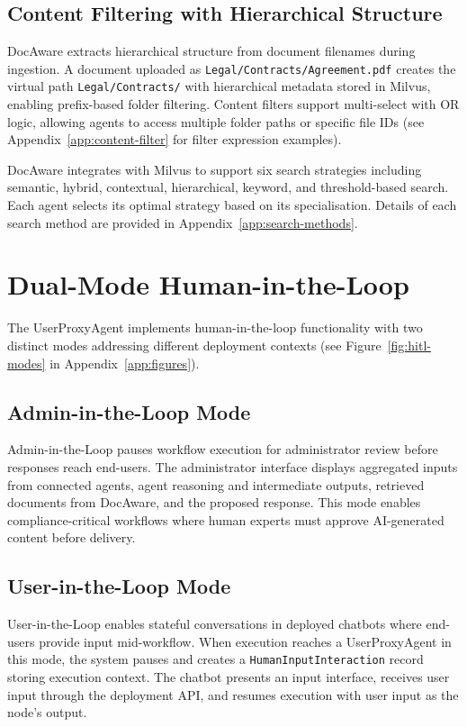 \documentclass[11pt]{article}
\begin{document}
\subsection{Content Filtering with Hierarchical Structure}

DocAware extracts hierarchical structure from document filenames during ingestion. A document uploaded as \texttt{Legal/Contracts/Agreement.pdf} creates the virtual path \texttt{Legal/Contracts/} with hierarchical metadata stored in Milvus, enabling prefix-based folder filtering. Content filters support multi-select with OR logic, allowing agents to access multiple folder paths or specific file IDs (see Appendix~\ref{app:content-filter} for filter expression examples).

DocAware integrates with Milvus to support six search strategies including semantic, hybrid, contextual, hierarchical, keyword, and threshold-based search. Each agent selects its optimal strategy based on its specialisation. Details of each search method are provided in Appendix~\ref{app:search-methods}.


\section{Dual-Mode Human-in-the-Loop}
\label{sec:hitl}

The UserProxyAgent implements human-in-the-loop functionality with two distinct modes addressing different deployment contexts (see Figure~\ref{fig:hitl-modes} in Appendix~\ref{app:figures}).

\subsection{Admin-in-the-Loop Mode}

Admin-in-the-Loop pauses workflow execution for administrator review before responses reach end-users. The administrator interface displays aggregated inputs from connected agents, agent reasoning and intermediate outputs, retrieved documents from DocAware, and the proposed response. This mode enables compliance-critical workflows where human experts must approve AI-generated content before delivery.

\subsection{User-in-the-Loop Mode}

User-in-the-Loop enables stateful conversations in deployed chatbots where end-users provide input mid-workflow. When execution reaches a UserProxyAgent in this mode, the system pauses and creates a \texttt{HumanInputInteraction} record storing execution context. The chatbot presents an input interface, receives user input through the deployment API, and resumes execution with user input as the node's output.
\end{document}
